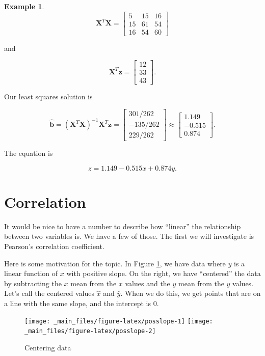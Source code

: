 \documentclass[
]{book}
\theoremstyle{definition}
\theoremstyle{definition}
\newtheorem{example}{Example}[chapter]
\theoremstyle{definition}
\theoremstyle{definition}
\theoremstyle{remark}
\begin{document}
\begin{examplebox}
\begin{example}
\[\mathbf{X}^T\mathbf{X}=\begin{bmatrix}5 & 15 & 16\\15 & 61 & 54\\16 & 54 & 60\end{bmatrix}\]

and

\[\mathbf{X}^T\mathbf{z}=\begin{bmatrix}12\\33\\43\end{bmatrix}.\]

Our least squares solution is

\[\hat{\mathbf{b}}=(\mathbf{X}^T\mathbf{X})^{-1}\mathbf{X}^T\mathbf{z}=\begin{bmatrix}301/262\\-135/262\\229/262\end{bmatrix}\approx\begin{bmatrix}1.149\\-0.515\\0.874\end{bmatrix}.\]

The equation is

\[z=1.149-0.515x+0.874y.\]
\end{example}

\end{examplebox}

\section{Correlation}\label{CorSec}

It would be nice to have a number to describe how ``linear'' the relationship between two variables is. We have a few of those. The first we will investigate is Pearson's correlation coefficient.

Here is some motivation for the topic. In Figure \ref{fig:posslope}, we have data where \(y\) is a linear function of \(x\) with positive slope. On the right, we have ``centered'' the data by subtracting the \(x\) mean from the \(x\) values and the \(y\) mean from the \(y\) values. Let's call the centered values \(\hat{x}\) and \(\hat{y}\). When we do this, we get points that are on a line with the same slope, and the intercept is 0.

\begin{figure}
\texttt{[image: \_main\_files/figure-latex/posslope-1]} \texttt{[image: \_main\_files/figure-latex/posslope-2]} \caption{Centering data}\label{fig:posslope}
\end{figure}
\end{document}
